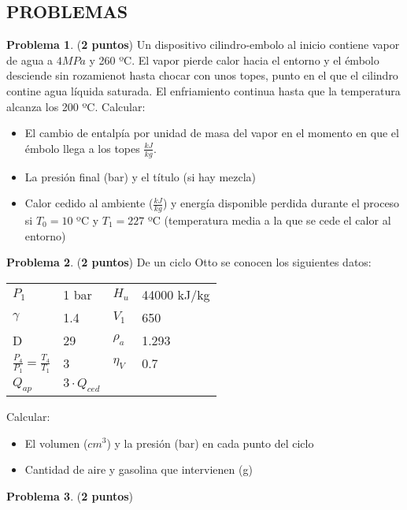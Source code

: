 \documentclass[12pt]{article}
\begin{document}
\subsection{PROBLEMAS}
\textbf{Problema 1}. (\textbf{2 puntos}) Un dispositivo cilindro-embolo al inicio contiene vapor de agua a $4 MPa$ y 260 ºC. El vapor pierde calor hacia el entorno y el émbolo desciende sin rozamienot hasta chocar con unos topes, punto en el que el cilindro contine agua líquida saturada. El enfriamiento continua hasta que la temperatura alcanza los 200 ºC. Calcular:
\begin{itemize}
    \item El cambio de entalpía por unidad de masa del vapor en el momento en que el émbolo llega a los topes $\frac{kJ}{kg}$.
    \item La presión final (bar) y el título (si hay mezcla)
    \item Calor cedido al ambiente ($\frac{kJ}{kg}$) y energía disponible perdida durante el proceso si $T _{0} = 10$ ºC y $T _{1}= 227$ ºC (temperatura media a la que se cede el calor al entorno)
\end{itemize}

\textbf{Problema 2}. (\textbf{2 puntos}) De un ciclo Otto se conocen los siguientes datos:
\begin{table}[h!]
    \centering
    \begin{tabular}{ll|ll}
    \hline
    $P _{1}$  & 1 bar & $H _{u}$ & 44000 kJ/kg \\
    $\gamma$  & 1.4   & $V _{1}$ & 650         \\
    D & 29    & $\rho _{a}$ & 1.293       \\
    $\frac{P _{4}}{P _{1}} =\frac{T _{4}}{T _{1} }$  & 3     & $\eta _{V}$ & 0.7         \\
     $Q _{ap}$  & $3\cdot Q _{ced}$     &  &             \\ \hline
    \end{tabular}
\end{table}
Calcular:
\begin{itemize}
    \item El volumen ($cm ^{3}$) y la presión (bar) en cada punto del ciclo
    \item Cantidad de aire y gasolina que intervienen (g)
\end{itemize}

\textbf{Problema 3}. (\textbf{2 puntos}) 
\end{document}
